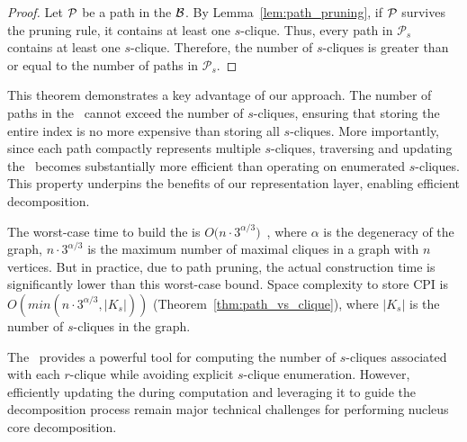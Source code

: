 \begin{proof}
Let $\TPath{}$ be a path in the \cpi $\mathcal{B}$.
By Lemma~\ref{lem:path_pruning}, if $\TPath{}$ survives
the pruning rule, it contains at least one $s$-clique.
Thus, every path in $\mathcal P_s$ contains at least one $s$-clique.
Therefore, the number of $s$-cliques is greater than or equal to the number of
\cpi paths in $\mathcal P_s$.
\end{proof}

\begin{remark}
This theorem demonstrates a key advantage of our approach.
The number of paths in the \cpi\ cannot exceed the number of $s$-cliques, ensuring that storing the entire index is no more expensive than storing all $s$-cliques. 
More importantly, since each path compactly represents multiple $s$-cliques, traversing and updating the \cpi\ becomes substantially more efficient than operating on enumerated $s$-cliques. 
This property underpins the benefits of our representation layer, enabling efficient decomposition.
\end{remark}



The worst-case time to build the \cpi is $O\big(n\cdot 3^{\alpha/3}\big)$~\cite{Pivoter}, where $\alpha$ is the degeneracy of the graph, $n\cdot 3^{\alpha/3}$ is the maximum number of maximal cliques in a graph with $n$ vertices.
But in practice, due to path pruning, the actual construction time is significantly lower than this worst-case bound.
Space complexity to store CPI is $O(min(n\cdot 3^{\alpha/3}, |K_s|))$ (Theorem~\ref{thm:path_vs_clique}),
where $|K_s|$ is the number of $s$-cliques in the graph.

The \cpi\ provides a powerful tool for computing the number of $s$-cliques associated with each $r$-clique while avoiding explicit $s$-clique enumeration. 
%
However, efficiently updating the \cpi during computation and leveraging it to guide the decomposition process remain major technical challenges for performing nucleus core decomposition.

